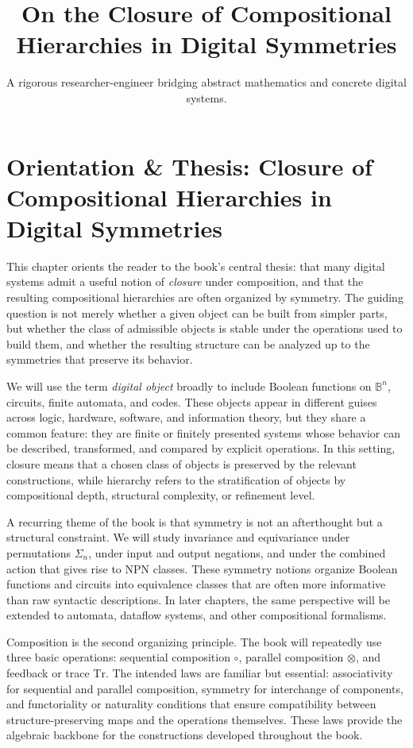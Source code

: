 \documentclass[11pt]{article}
\title{On the Closure of Compositional Hierarchies in Digital Symmetries}
\author{A rigorous researcher-engineer bridging abstract mathematics and concrete digital systems.}
\begin{document}
\section*{Orientation \& Thesis: Closure of Compositional Hierarchies in Digital Symmetries}

This chapter orients the reader to the book's central thesis: that many digital systems admit a useful notion of \emph{closure} under composition, and that the resulting compositional hierarchies are often organized by symmetry. The guiding question is not merely whether a given object can be built from simpler parts, but whether the class of admissible objects is stable under the operations used to build them, and whether the resulting structure can be analyzed up to the symmetries that preserve its behavior.

We will use the term \emph{digital object} broadly to include Boolean functions on \(\mathbb{B}^n\), circuits, finite automata, and codes. These objects appear in different guises across logic, hardware, software, and information theory, but they share a common feature: they are finite or finitely presented systems whose behavior can be described, transformed, and compared by explicit operations. In this setting, closure means that a chosen class of objects is preserved by the relevant constructions, while hierarchy refers to the stratification of objects by compositional depth, structural complexity, or refinement level.

A recurring theme of the book is that symmetry is not an afterthought but a structural constraint. We will study invariance and equivariance under permutations \(\Sigma_n\), under input and output negations, and under the combined action that gives rise to NPN classes. These symmetry notions organize Boolean functions and circuits into equivalence classes that are often more informative than raw syntactic descriptions. In later chapters, the same perspective will be extended to automata, dataflow systems, and other compositional formalisms.

Composition is the second organizing principle. The book will repeatedly use three basic operations: sequential composition \(\circ\), parallel composition \(\otimes\), and feedback or trace \(\mathrm{Tr}\). The intended laws are familiar but essential: associativity for sequential and parallel composition, symmetry for interchange of components, and functoriality or naturality conditions that ensure compatibility between structure-preserving maps and the operations themselves. These laws provide the algebraic backbone for the constructions developed throughout the book.
\end{document}
